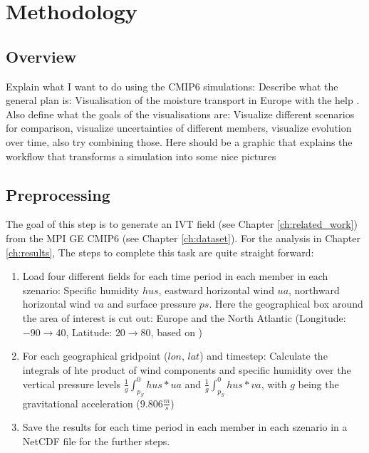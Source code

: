 \chapter{Methodology}
\label{ch:methodology}

\section{Overview}

Explain what I want to do using the CMIP6 simulations: Describe what the general plan is: Visualisation of the moisture transport in Europe with the help . 
Also define what the goals of the visualisations are: Visualize different scenarios for comparison, visualize uncertainties of different members, visualize evolution over time, also try combining those. 
Here should be a graphic that explains the workflow that transforms a simulation into some nice pictures


\section{Preprocessing}

The goal of this step is to generate an IVT field (see Chapter \ref{ch:related_work}) from the MPI GE CMIP6 (see Chapter \ref{ch:dataset}). 
For the analysis in Chapter \ref{ch:results}, 
The steps to complete this task are quite straight forward:

\begin{enumerate}
  \item Load four different fields for each time period in each member in each szenario: Specific humidity $hus$, eastward horizontal wind $ua$, northward horizontal wind $va$ and surface pressure $ps$. Here the geographical box around the area of interest is cut out: Europe and the North Atlantic (Longitude: $-90 \to 40$, Latitude: $20 \to 80$, based on \cite{vietinghoff_visual_2021})
  \item For each geographical gridpoint ($lon$, $lat$) and timestep: Calculate the integrals of hte product of wind components and specific humidity over the vertical pressure levels $\frac{1}{g}\int_{p_S}^0 hus * ua$ and  $\frac{1}{g}\int_{p_S}^0 hus * va$, with $g$ being the gravitational acceleration ($9.806 \frac{m}{s}$) 
  \item Save the results for each time period in each member in each szenario in a NetCDF file for the further steps. 
  
\end{enumerate}

